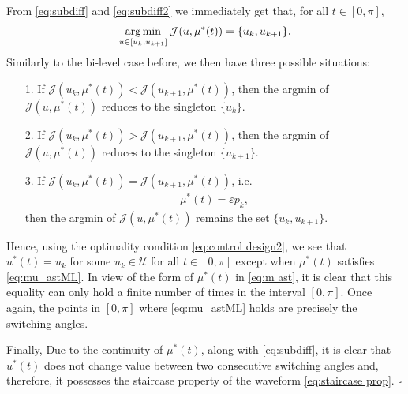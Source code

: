 \documentclass[twocolumn]{autart}    %
\begin{document}
From \eqref{eq:subdiff} and \eqref{eq:subdiff2} we immediately get that, for all $t\in[0,\pi]$,
\begin{align*}
	\operatorname*{arg\,min}_{u\in[u_k,u_{k+1}]}  \mathcal{J} (u,\mu^\ast(t)) = \{u_k,u_{k+1}\}.
\end{align*}
Similarly to the bi-level case before, we then have three possible situations:
\begin{itemize}
	\item[1.] If $\mathcal{J}(u_k,\mu^\ast(t)) <  \mathcal{J}(u_{k+1},\mu^\ast(t))$, then the argmin of $\mathcal{J} (u,\mu^\ast(t))$ reduces to the singleton $\{u_k\}$.
	\vspace{0.2cm}
	\item[2.] If $\mathcal{J}(u_k,\mu^\ast(t)) >  \mathcal{J}(u_{k+1},\mu^\ast(t))$, then the argmin of $\mathcal{J} (u,\mu^\ast(t))$ reduces to the singleton $\{u_{k+1}\}$.
	\vspace{0.2cm}
	\item[3.] If $\mathcal{J}(u_k,\mu^\ast(t)) =  \mathcal{J}(u_{k+1},\mu^\ast(t))$, i.e. 
	\begin{align}\label{eq:mu_astML}
		\mu^\ast (t) = \varepsilon p_k,
	\end{align}
	then the argmin of $\mathcal{J} (u,\mu^\ast(t))$ remains the set $\{u_k,u_{k+1}\}$.
\end{itemize}

Hence, using the optimality condition \eqref{eq:control design2}, we see that $u^\ast(t)=u_k$ for some $u_k\in\mathcal U$ for all $t\in [0,\pi]$ except when $\mu^\ast(t)$ satisfies \eqref{eq:mu_astML}. In view of the form of $\mu^\ast(t)$ in \eqref{eq:m ast}, it is clear that this equality can only hold a finite number of times in the interval $[0,\pi]$. Once again, the points in $[0,\pi]$ where \eqref{eq:mu_astML} holds are precisely the switching angles.

Finally, Due to the continuity of $\mu^\ast(t)$, along with \eqref{eq:subdiff}, it is clear that $u^\ast(t)$ does not change value between two consecutive switching angles and, therefore, it possesses the staircase property of the waveform \eqref{eq:staircase prop}. \hfill $\square$
\end{document}

